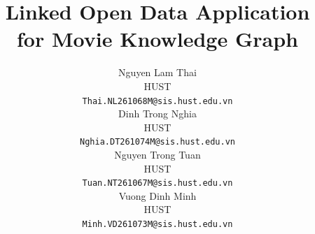 \documentclass{article}
\title{Linked Open Data Application\\for Movie Knowledge Graph}
\author{%
  Nguyen Lam Thai \\
  HUST \\
  \texttt{Thai.NL261068M@sis.hust.edu.vn} \\
  \And
  Dinh Trong Nghia \\
  HUST \\
  \texttt{Nghia.DT261074M@sis.hust.edu.vn} \\
  \And
  Nguyen Trong Tuan \\
  HUST \\
  \texttt{Tuan.NT261067M@sis.hust.edu.vn} \\
  \And
  Vuong Dinh Minh \\
  HUST \\
  \texttt{Minh.VD261073M@sis.hust.edu.vn} \\
}
\begin{document}
\maketitle











\small




\end{document}
